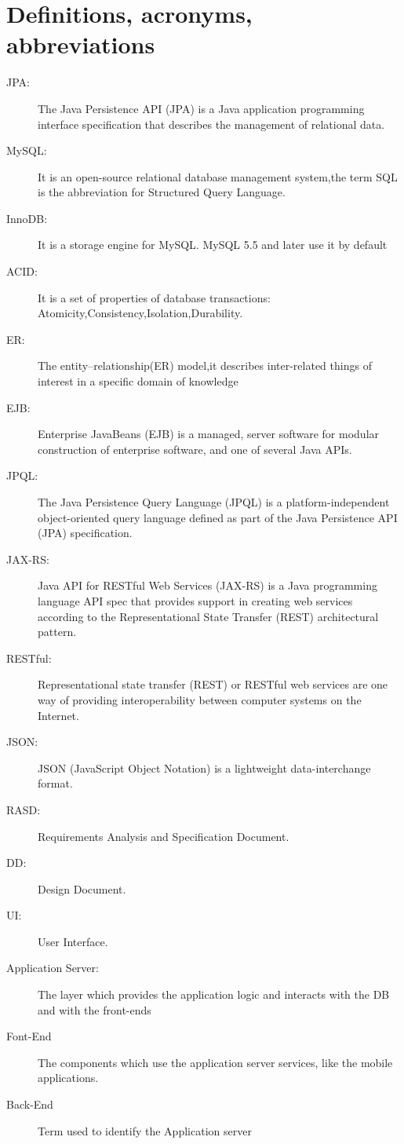 \section{Definitions, acronyms, abbreviations}
\begin{description}
    \item[JPA:] The Java Persistence API (JPA) is a Java application programming interface specification that describes the management of relational data.
    \item[MySQL:]It is an open-source relational database management system,the term SQL is the abbreviation for Structured Query Language.
    \item[InnoDB:]It is a storage engine for MySQL. MySQL 5.5 and later use it by default
    \item[ACID:]It is a set of properties of database transactions: Atomicity,Consistency,Isolation,Durability.
    \item[ER:]The entity–relationship(ER) model,it describes inter-related things of interest in a specific domain of knowledge
    \item[EJB:]Enterprise JavaBeans (EJB) is a managed, server software for modular construction of enterprise software, and one of several Java APIs.
    \item[JPQL:]The Java Persistence Query Language (JPQL) is a platform-independent object-oriented query language defined as part of the Java Persistence API (JPA) specification.
    \item[JAX-RS:]Java API for RESTful Web Services (JAX-RS) is a Java programming language API spec that provides support in creating web services according to the Representational State Transfer (REST) architectural pattern.
    \item[RESTful:]Representational state transfer (REST) or RESTful web services are one way of providing interoperability between computer systems on the Internet.
    \item[JSON:]JSON (JavaScript Object Notation) is a lightweight data-interchange format.
    \item[RASD:] Requirements Analysis and Specification Document.
    \item[DD:] Design Document.
    \item[UI:] User Interface.
    \item[Application Server:]The layer which provides the application logic and interacts
with the DB and with the front-ends
    \item[Font-End]The components which use the application server services, like the mobile applications.
    \item[Back-End]Term used to identify the Application server
    
\end{description}
